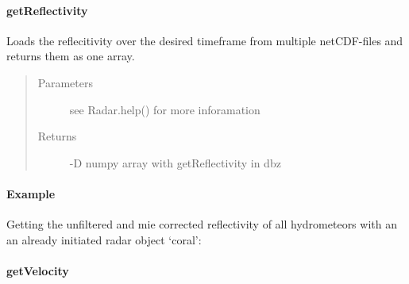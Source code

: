 \documentclass[letterpaper,10pt,english]{sphinxmanual}
\begin{document}
\begin{fulllineitems}
\begin{fulllineitems}
\end{fulllineitems}



\paragraph{getReflectivity}
\label{\detokenize{generated/MPPy.Instruments.Radar.Radar.getReflectivity:getreflectivity}}\label{\detokenize{generated/MPPy.Instruments.Radar.Radar.getReflectivity::doc}}

\begin{fulllineitems}
\label{\detokenize{generated/MPPy.Instruments.Radar.Radar.getReflectivity:MPPy.Instruments.Radar.Radar.getReflectivity}}
Loads the reflecitivity over the desired timeframe from multiple netCDF-files and returns them as one array.
\begin{quote}\begin{description}
\item[{Parameters}] \leavevmode
{} \textendash{} see Radar.help() for more inforamation

\item[{Returns}] -D numpy array with getReflectivity in dbz

\end{description}\end{quote}
\paragraph{Example}

Getting the unfiltered and mie corrected reflectivity of all hydrometeors with an an already
initiated radar object ‘coral’:

\begin{sphinxVerbatim}[commandchars=\\\{\}]
\end{sphinxVerbatim}

\end{fulllineitems}



\paragraph{getVelocity}
\label{\detokenize{generated/MPPy.Instruments.Radar.Radar.getVelocity::doc}}\label{\detokenize{generated/MPPy.Instruments.Radar.Radar.getVelocity:getvelocity}}


\end{fulllineitems}
\end{document}
